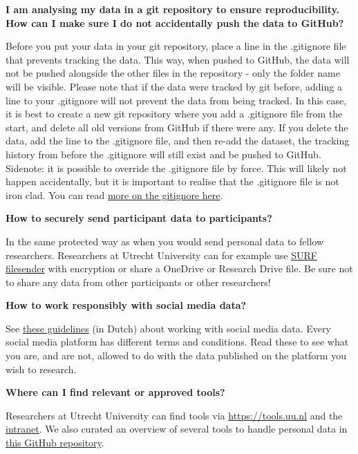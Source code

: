 \documentclass[
]{book}
\begin{document}
\textbf{I am analysing my data in a git repository to ensure reproducibility. How can I make sure I do not accidentally push the data to GitHub?}

Before you put your data in your git repository, place a line in the .gitignore file that prevents tracking the data. This way, when pushed to GitHub, the data will not be pushed alongside the other files in the repository - only the folder name will be visible. Please note that if the data were tracked by git before, adding a line to your .gitignore will not prevent the data from being tracked. In this case, it is best to create a new git repository where you add a .gitignore file from the start, and delete all old versions from GitHub if there were any. If you delete the data, add the line to the .gitignore file, and then re-add the dataset, the tracking history from before the .gitignore will still exist and be pushed to GitHub. Sidenote: it is possible to override the .gitignore file by force. This will likely not happen accidentally, but it is important to realise that the .gitignore file is not iron clad. You can read \href{https://the-turing-way.netlify.app/project-design/sdpw/pd-sdp-sensitive-files.html}{more on the gitignore here}.

\textbf{How to securely send participant data to participants?}

In the same protected way as when you would send personal data to fellow researchers. Researchers at Utrecht University can for example use \href{https://filesender.surf.nl/}{SURF filesender} with encryption or share a OneDrive or Research Drive file. Be sure not to share any data from other participants or other researchers!

\textbf{How to work responsibly with social media data?}

See \href{https://doi.org/10.33540/1874/406645}{these guidelines} (in Dutch) about working with social media data. Every social media platform has different terms and conditions. Read these to see what you are, and are not, allowed to do with the data published on the platform you wish to research.

\textbf{Where can I find relevant or approved tools?}

Researchers at Utrecht University can find tools via \url{https://tools.uu.nl} and the \href{https://intranet.uu.nl/en/knowledgebase/software-at-work-teaching-rooms-and-home}{intranet}. We also curated an overview of several tools to handle personal data in \href{https://github.com/UtrechtUniversity/privacy-engineering-tools/}{this GitHub repository}.
\end{document}
